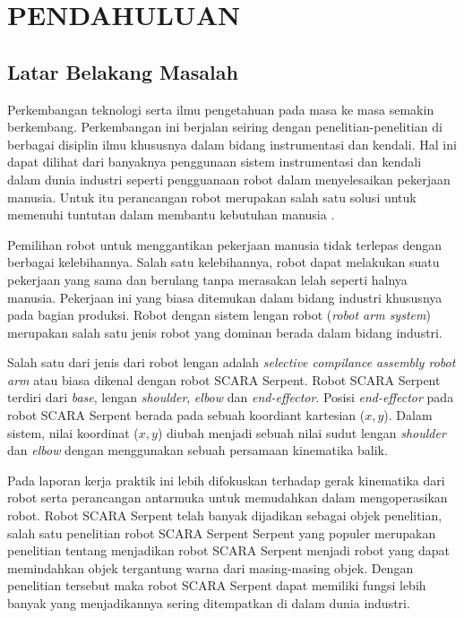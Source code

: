 
\chapter{PENDAHULUAN}

\section{Latar Belakang Masalah}

Perkembangan teknologi serta ilmu pengetahuan pada masa ke masa semakin berkembang. Perkembangan ini berjalan seiring dengan penelitian-penelitian di berbagai disiplin ilmu khususnya dalam bidang instrumentasi dan kendali. Hal ini dapat dilihat dari banyaknya penggunaan sistem instrumentasi dan kendali dalam dunia industri seperti pengguanaan robot dalam menyelesaikan pekerjaan manusia. Untuk itu perancangan robot merupakan salah satu solusi untuk memenuhi tuntutan dalam membantu kebutuhan manusia \cite{Faris2012}.

Pemilihan robot untuk menggantikan pekerjaan manusia tidak terlepas dengan berbagai kelebihannya. Salah satu kelebihannya, robot dapat melakukan suatu pekerjaan yang sama dan berulang tanpa merasakan lelah seperti halnya manusia. Pekerjaan ini yang biasa ditemukan dalam bidang industri khususnya pada bagian produksi. Robot dengan sistem lengan robot (\emph {robot arm system}) merupakan salah satu jenis robot yang dominan berada dalam bidang industri\cite{Bimantaka2014}. 

Salah satu dari jenis dari robot lengan adalah\textit{ selective compilance assembly robot arm} atau biasa dikenal dengan robot SCARA Serpent. Robot SCARA Serpent terdiri dari \textit{base}, lengan \textit{shoulder}, \textit{elbow} dan \textit{end-effector}. Posisi \textit{end-effector} pada robot SCARA Serpent berada pada sebuah koordiant kartesian ($x, y$). Dalam sistem, nilai koordinat ($x, y$) diubah menjadi sebuah nilai sudut lengan \textit{shoulder} dan \textit{elbow} dengan menggunakan sebuah persamaan kinematika balik.  

Pada laporan kerja praktik ini lebih difokuskan terhadap gerak kinematika dari robot serta perancangan antarmuka untuk memudahkan dalam mengoperasikan robot. Robot SCARA Serpent telah banyak dijadikan sebagai objek penelitian, salah satu penelitian robot SCARA Serpent Serpent yang populer merupakan penelitian tentang menjadikan robot SCARA Serpent menjadi robot yang dapat memindahkan objek tergantung warna dari masing-masing objek. Dengan penelitian tersebut maka robot SCARA Serpent dapat memiliki fungsi lebih banyak yang menjadikannya sering ditempatkan di dalam dunia industri.

